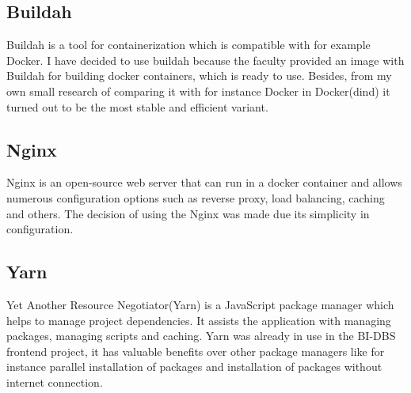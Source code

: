 \subsection{Buildah} Buildah is a tool for containerization which is compatible with for example Docker. I have decided to use buildah because the faculty provided an image with Buildah for building docker containers, which is ready to use. Besides, from my own small research of comparing it with for instance Docker in Docker(dind) it turned out to be the most stable and efficient variant.

\subsection{Nginx} Nginx is an open-source web server that can run in a docker container and allows numerous configuration options such as reverse proxy, load balancing, caching and others. The decision of using the Nginx was made due its simplicity in configuration.

\subsection{Yarn} Yet Another Resource Negotiator(Yarn) is a JavaScript package manager which helps to manage project dependencies. It assists the application with managing packages, managing scripts and caching. Yarn was already in use in the BI-DBS frontend project, it has valuable benefits over other package managers like for instance parallel installation of packages and installation of packages without internet connection.
